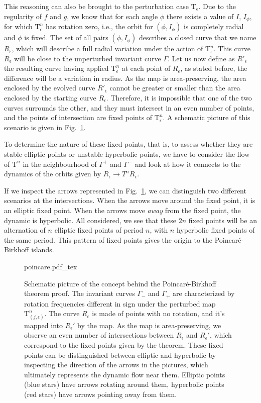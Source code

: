 This reasoning can also be brought to the perturbation case $\mathrm{T}_\epsilon$. Due to the regularity of $f$ and $g$, we know that for each angle $\phi$ there exists a value of $I$, $I_\phi$, for which $\mathrm{T}^n_\epsilon$ has rotation zero, i.e., the orbit for $(\phi, I_\phi)$ is completely radial and $\phi$ is fixed. The set of all pairs $(\phi, I_\phi)$ describes a closed curve that we name $R_\epsilon$, which will describe a full radial variation under the action of $\mathrm{T}^n_\epsilon$. This curve $R_\epsilon$ will be close to the unperturbed invariant curve $\Gamma$. Let us now define as $R'_\epsilon$ the resulting curve having applied $\mathrm{T}^n_\epsilon$ at each point of $R_\epsilon$, as stated before, the difference will be a variation in radius. As the map is area-preserving, the area enclosed by the evolved curve $R'_\epsilon$ cannot be greater or smaller than the area enclosed by the starting curve $R_\epsilon$. Therefore, it is impossible that one of the two curves surrounds the other, and they must intersect in an even number of points, and the points of intersection are fixed points of $\mathrm{T}^n_\epsilon$. A schematic picture of this scenario is given in Fig.~\ref{fig:tnepsilon}.

To determine the nature of these fixed points, that is, to assess whether they are stable elliptic points or unstable hyperbolic points, we have to consider the flow of $\mathrm{T}^n$ in the neighbourhood of $\Gamma^+$ and $\Gamma^-$ and look at how it connects to the dynamics of the orbits given by $R_\epsilon \to T^n R_\epsilon$.

If we inspect the arrows represented in Fig.~\ref{fig:tnepsilon}, we can distinguish two different scenarios at the intersections. When the arrows move around the fixed point, it is an elliptic fixed point. When the arrows move \textit{away} from the fixed point, the dynamic is hyperbolic. All considered, we see that these $2n$ fixed points will be an alternation of $n$ elliptic fixed points of period $n$, with $n$ hyperbolic fixed points of the same period. This pattern of fixed points gives the origin to the Poincaré-Birkhoff islands.

\begin{figure}
	\centering
	\def\svgwidth{0.75\columnwidth}
    {poincare.pdf_tex}
    \caption{Schematic picture of the concept behind the Poincaré-Birkhoff theorem proof. The invariant curves $\Gamma_-$ and $\Gamma_+$ are characterized by rotation frequencies different in sign under the perturbed map $\mathrm{T}^n_(j,\epsilon)$. The curve $R_\epsilon$ is made of points with no rotation, and it's mapped into $R_\epsilon'$ by the map. As the map is area-preserving, we observe an even number of intersections between $R_\epsilon$ and $R_\epsilon'$, which correspond to the fixed points given by the theorem. These fixed points can be distinguished between elliptic and hyperbolic by inspecting the direction of the arrows in the pictures, which ultimately represents the dynamic flow near them. Elliptic points (blue stars) have arrows rotating around them, hyperbolic points (red stars) have arrows pointing away from them.}
    \label{fig:tnepsilon}
\end{figure}

